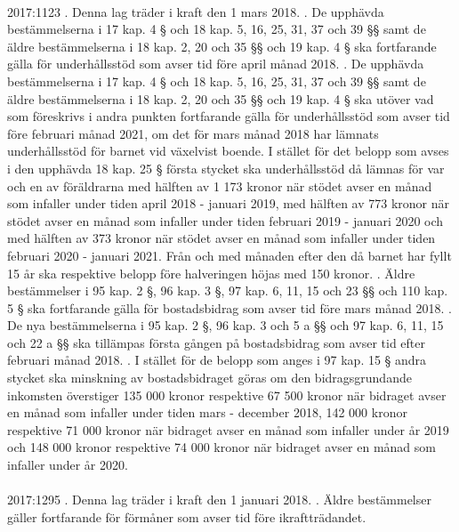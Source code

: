 \documentclass[a4paper,notitlepage,openany,10pt]{book}
\begin{document}
\paragraph*{}
2017:1123
. Denna lag träder i kraft den 1 mars 2018.
. De upphävda bestämmelserna i 17 kap. 4 § och 18 kap. 5, 16, 25, 31, 37 och 39 §§ samt de äldre bestämmelserna i 18 kap. 2, 20 och 35 §§ och 19 kap. 4 § ska fortfarande gälla för underhållsstöd som avser tid före april månad 2018.
. De upphävda bestämmelserna i 17 kap. 4 § och 18 kap. 5, 16, 25, 31, 37 och 39 §§ samt de äldre bestämmelserna i 18 kap. 2, 20 och 35 §§ och 19 kap. 4 § ska utöver vad som föreskrivs i andra punkten fortfarande gälla för underhållsstöd som avser tid före februari månad 2021, om det för mars månad 2018 har lämnats underhållsstöd för barnet vid växelvist boende. I stället för det belopp som avses i den upphävda 18 kap. 25 § första stycket ska underhållsstöd då lämnas för var och en av föräldrarna med hälften av 1 173 kronor när stödet avser en månad som infaller under tiden april 2018 - januari 2019, med hälften av 773 kronor när stödet avser en månad som infaller under tiden februari 2019 - januari 2020 och med hälften av 373 kronor när stödet avser en månad som infaller under tiden februari 2020 - januari 2021. Från och med månaden efter den då barnet har fyllt 15 år ska respektive belopp före halveringen höjas med 150 kronor.
. Äldre bestämmelser i 95 kap. 2 §, 96 kap. 3 §, 97 kap. 6, 11, 15 och 23 §§ och 110 kap. 5 § ska fortfarande gälla för bostadsbidrag som avser tid före mars månad 2018.
. De nya bestämmelserna i 95 kap. 2 §, 96 kap. 3 och 5 a §§ och 97 kap. 6, 11, 15 och 22 a §§ ska tillämpas första gången på bostadsbidrag som avser tid efter februari månad 2018.
. I stället för de belopp som anges i 97 kap. 15 § andra stycket ska minskning av bostadsbidraget göras om den bidragsgrundande inkomsten överstiger 135 000 kronor respektive 67 500 kronor när bidraget avser en månad som infaller under tiden mars - december 2018, 142 000 kronor respektive 71 000 kronor när bidraget avser en månad som infaller under år 2019 och 148 000 kronor respektive 74 000 kronor när bidraget avser en månad som infaller under år 2020.
\paragraph*{}
2017:1295
. Denna lag träder i kraft den 1 januari 2018.
. Äldre bestämmelser gäller fortfarande för förmåner som avser tid före ikraftträdandet.
\end{document}
